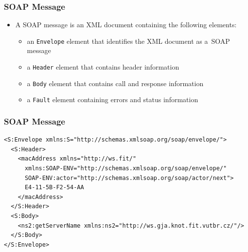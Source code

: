 \documentclass[10pt,xcolor=pdflatex]{beamer}
\begin{document}
\begin{frame}[containsverbatim]\frametitle{SOAP Message}
\begin{itemize}
  \item A SOAP message is an XML document containing the following elements:
    \begin{itemize}
      \item an \texttt{Envelope} element that identifies the XML document as a~SOAP message
      \item a \texttt{Header} element that contains header information
      \item a \texttt{Body} element that contains call and response information
      \item a \texttt{Fault} element containing errors and status information
    \end{itemize}
\end{itemize}
\end{frame}


\begin{frame}[containsverbatim]\frametitle{SOAP Message}
\begin{footnotesize}
\begin{verbatim}
<S:Envelope xmlns:S="http://schemas.xmlsoap.org/soap/envelope/">
  <S:Header>
    <macAddress xmlns="http://ws.fit/"
      xmlns:SOAP-ENV="http://schemas.xmlsoap.org/soap/envelope/" 				 
      SOAP-ENV:actor="http://schemas.xmlsoap.org/soap/actor/next">
      E4-11-5B-F2-54-AA
    </macAddress>
  </S:Header>
  <S:Body>
    <ns2:getServerName xmlns:ns2="http://ws.gja.knot.fit.vutbr.cz/"/>
  </S:Body>
</S:Envelope>
\end{verbatim}
\end{footnotesize}
\end{frame}
\end{document}
